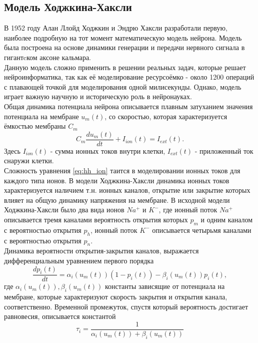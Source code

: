 \documentclass[a4paper,10pt]{article}
\begin{document}
\subsection{Модель Ходжкина-Хаксли}
	В 1952 году Алан Ллойд Ходжкин и Эндрю Хаксли разработали первую, наиболее подробную на тот момент математическую модель нейрона. Модель была построена на основе динамики генерации и передачи нервного сигнала в гигантcком аксоне кальмара.\\
	\indent Данную модель сложно применить в решении реальных задач, которые решает нейроинформатика, так как её моделирование ресурсоёмко - около 1200 операций с плавающей точкой для моделирования одной милисекунды\cite{BohteReview}. Однако, модель играет важную научную и историческую роль в нейронауках.\\
	\indent Общая динамика потенциала нейрона описывается плавным затуханием значения потенциала на мембране $u_{m}(t)$, со скоростью, которая характеризуется ёмкостью мембраны $C_{m}$
	\begin{equation}\label{eq:hh}
	C_{m}\frac{du_{m}(t)}{dt}+I_{ion}(t)=I_{ext}(t).
	\end{equation}	 
	\indent Здесь $I_{ion}(t)$ - сумма ионных токов внутри клетки, $I_{ext}(t)$ - приложенный ток снаружи клетки.\\
	\indent Сложность уравнения \eqref{eq:hh_ion}	 таится в моделировании ионных токов для каждого типа ионов. В модели Ходжкина-Хаксли динамика ионных токов характеризуется наличием т.н. ионных каналов, открытие или закрытие которых влияет на общую динамику напряжения на мембране. В исходной модели Ходжкина-Хаксли было два вида ионов $Na^{+}$ и $K^{-}$, где ионный поток $Na^{+}$ описывается тремя каналами вероятность открытия которых $p_{m}$ и одним каналом с вероятностью открытия $p_{h}$, ионный поток $K^{-}$ описывается четырьмя каналами с вероятностью открытия $p_{n}$\cite{Genesis}.\\ 
	\indent Динамика вероятности открытия-закрытия каналов, выражается дифференциальным уравнением первого порядка
	\begin{equation}\label{eq:hh_pch}
	\frac{dp_{i}(t)}{dt} = \alpha_{i}(u_{m}(t))(1-p_{i}(t)) - \beta_{i}(u_{m}(t))p_{i}(t),
	\end{equation}	 
	где $\alpha_{i}(u_{m}(t)), \beta_{i}(u_{m}(t))$ константы зависящие от потенциала на мембране, которые характеризуют скорость закрытия и открытия канала, соответственно. Временной промежуток, спустя который вероятность достигает равновесия, описывается константой
	\begin{equation}\label{eq:hh_t}
	\tau_{i}=\frac{1}{\alpha_{i}(u_{m}(t))+\beta_{i}(u_{m}(t))}	
	\end{equation}
\end{document}
